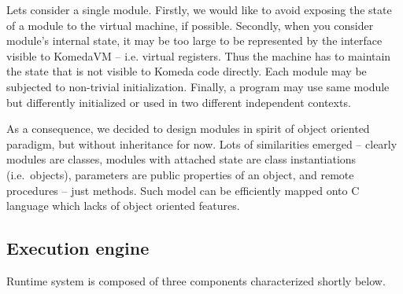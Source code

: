 \documentclass{article}
\begin{document}
Lets consider a single module. Firstly, we would like to avoid exposing the
state of a module to the virtual machine, if possible. Secondly, when you
consider module's internal state, it may be too large to be represented by the
interface visible to KomedaVM -- i.e. virtual registers. Thus the machine has
to maintain the state that is not visible to Komeda code directly.  Each module
may be subjected to non-trivial initialization. Finally, a program may use same
module but differently initialized or used in two different independent
contexts.

As a consequence, we decided to design modules in spirit of object oriented
paradigm, but without inheritance for now.  Lots of similarities emerged --
clearly modules are classes, modules with attached state are class
instantiations (i.e.~objects), parameters are public properties of an object,
and remote procedures -- just methods.  Such model can be efficiently mapped
onto C language which lacks of object oriented features.

\subsection{Execution engine}

Runtime system is composed of three components characterized shortly below.
\end{document}
